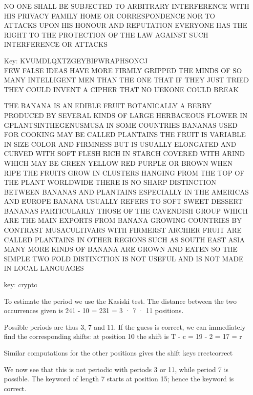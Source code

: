 \documentclass[12pt,a4paper]{article}
\begin{document}
\frontpart

 \exercise
	NO ONE SHALL BE SUBJECTED TO ARBITRARY INTERFERENCE WITH HIS PRIVACY FAMILY HOME OR CORRESPONDENCE NOR TO ATTACKS UPON HIS HONOUR AND REPUTATION EVERYONE HAS THE RIGHT TO THE PROTECTION OF THE LAW AGAINST SUCH INTERFERENCE OR ATTACKS



 \exercise
 	Key: KVUMDLQXTZGEYBIFWRAPHSONCJ \\
 	FEW FALSE IDEAS HAVE MORE FIRMLY GRIPPED THE MINDS OF SO MANY INTELLIGENT MEN THAN THE ONE THAT IF THEY JUST TRIED THEY COULD INVENT A CIPHER THAT NO UEKONE COULD BREAK

 \exercise
 	THE BANANA IS AN EDIBLE FRUIT BOTANICALLY A BERRY PRODUCED BY SEVERAL KINDS OF LARGE HERBACEOUS FLOWER IN GPLANTSINTHEGENUSMUSA IN SOME COUNTRIES BANANAS 
	USED FOR COOKING MAY BE CALLED PLANTAINS THE FRUIT IS VARIABLE IN SIZE COLOR AND FIRMNESS BUT IS USUALLY ELONGATED AND CURVED WITH SOFT FLESH RICH IN STARCH
	COVERED WITH ARIND WHICH MAY BE GREEN YELLOW RED PURPLE OR BROWN WHEN RIPE THE FRUITS GROW IN CLUSTERS HANGING FROM THE TOP OF THE PLANT WORLDWIDE
	THERE IS NO SHARP DISTINCTION BETWEEN BANANAS AND PLANTAINS ESPECIALLY IN THE AMERICAS AND EUROPE BANANA USUALLY REFERS TO SOFT SWEET DESSERT BANANAS 
	PARTICULARLY THOSE OF THE CAVENDISH GROUP WHICH ARE THE MAIN EXPORTS FROM BANANA GROWING COUNTRIES BY CONTRAST MUSACULTIVARS WITH FIRMERST ARCHIER FRUIT ARE CALLED 
	PLANTAINS IN OTHER REGIONS SUCH AS SOUTH EAST ASIA MANY MORE KINDS OF BANANA ARE GROWN AND EATEN SO THE SIMPLE TWO FOLD DISTINCTION IS NOT USEFUL AND IS NOT 
	MADE IN LOCAL LANGUAGES

	key: crypto


 \exercise
 To estimate the period we use the Kasiski test. The distance between the two occurrences
 given is
 241 - 10 = 231 = 3 · 7 · 11
 positions.
 
 Possible periods are thus 3, 7 and 11. If the guess is correct, we can immediately find the
 corresponding shifts: at position 10 the shift is
 T - c = 19 - 2 = 17 = r
 
 Similar computations for the other positions gives the shift keys
 rrectcorrect
 
 We now see that this is not periodic with periods 3 or 11, while period 7 is possible. The keyword
 of length 7 starts at position 15; hence the keyword is
 correct. 


 \exercise

%  
%
%
%  
%
%  
%	
%
%
%
%
%
%
%
\end{document}
